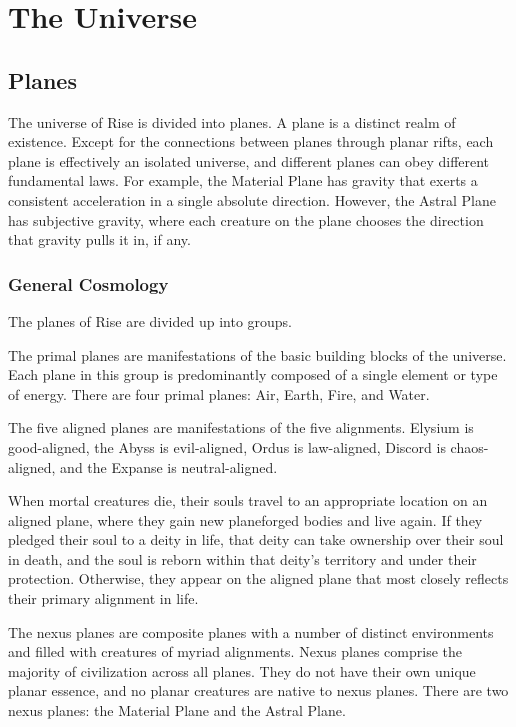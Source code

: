 \chapter{The Universe}

\section{Planes}\label{Planes}
  The universe of Rise is divided into planes.
  A plane is a distinct realm of existence.
  Except for the connections between planes through planar rifts, each plane is effectively an isolated universe, and different planes can obey different fundamental laws.
  For example, the Material Plane has gravity that exerts a consistent acceleration in a single absolute direction.
  However, the Astral Plane has subjective gravity, where each creature on the plane chooses the direction that gravity pulls it in, if any.

  \subsection{General Cosmology}
    The planes of Rise are divided up into groups.

     The primal planes are manifestations of the basic building blocks of the universe.
    Each plane in this group is predominantly composed of a single element or type of energy.
    There are four primal planes: Air, Earth, Fire, and Water.

     The five aligned planes are manifestations of the five alignments.
    Elysium is good-aligned, the Abyss is evil-aligned, Ordus is law-aligned, Discord is chaos-aligned, and the Expanse is neutral-aligned.

    When mortal creatures die, their souls travel to an appropriate location on an aligned plane, where they gain new planeforged bodies and live again.
    If they pledged their soul to a deity in life, that deity can take ownership over their soul in death, and the soul is reborn within that deity's territory and under their protection.
    Otherwise, they appear on the aligned plane that most closely reflects their primary alignment in life.

     The nexus planes are composite planes with a number of distinct environments and filled with creatures of myriad alignments.
    Nexus planes comprise the majority of civilization across all planes.
    They do not have their own unique planar essence, and no planar creatures are native to nexus planes.
    There are two nexus planes: the Material Plane and the Astral Plane.

